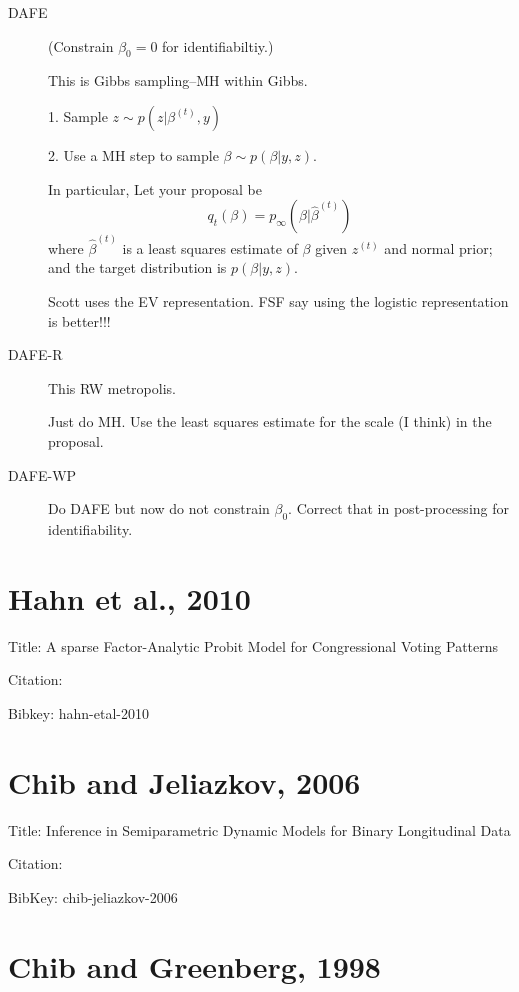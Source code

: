 \documentclass{article}
\begin{document}
\begin{description}

\item[DAFE] (Constrain $\beta_0=0$ for identifiabiltiy.)

This is Gibbs sampling--MH within Gibbs.

1. Sample $z \sim p(z | \beta^{(t)}, y)$

2. Use a MH step to sample $\beta \sim p(\beta | y,z)$.

In particular, Let your proposal be
\[
q_t(\beta) = p_\infty(\beta | \hat \beta^{(t)})
\]
where $\hat \beta^{(t)}$ is a least squares estimate of $\beta$ given $z^{(t)}$
and normal prior; and the target distribution is $p(\beta | y, z)$.

Scott uses the EV representation.  FSF say using the logistic representation is
better!!!

\item[DAFE-R]

This RW metropolis.

Just do MH.  Use the least squares estimate for the scale (I think) in the
proposal.

\item[DAFE-WP] Do DAFE but now do not constrain $\beta_0$.  Correct that in
  post-processing for identifiability.

\end{description}

\section{Hahn et al., 2010}

Title: A sparse Factor-Analytic Probit Model for Congressional Voting Patterns

Citation: \cite{hahn-etal-2010}

Bibkey: hahn-etal-2010

\section{Chib and Jeliazkov, 2006}

Title: Inference in Semiparametric Dynamic Models for Binary Longitudinal Data

Citation: \cite{chib-jeliazkov-2006}

BibKey: chib-jeliazkov-2006

\section{Chib and Greenberg, 1998}
\end{document}
